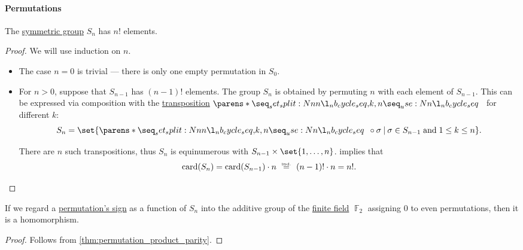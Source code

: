 \paragraph{Permutations}

\begin{proposition}\label{thm:symmetric_group_cardinality}
  The \hyperref[def:symmetric_group]{symmetric group} \( S_n \) has \( n! \) elements.
\end{proposition}
\begin{proof}
  We will use induction on \( n \).

  \begin{itemize}
    \item The case \( n = 0 \) is trivial --- there is only one empty permutation in \( S_0 \).

    \item For \( n > 0 \), suppose that \( S_{n - 1} \) has \( (n - 1)! \) elements. The group \( S_n \) is obtained by permuting \( n \) with each element of \( S_{n - 1} \). This can be expressed via composition with the \hyperref[def:transposition]{transposition} \( \cycle{ k, n } \) for different \( k \):
    \begin{equation*}
      S_n = \set{ \cycle{ k, n } \bincirc \sigma \given \sigma \in S_{n-1} \T{and} 1 \leq k \leq n }.
    \end{equation*}

    There are \( n \) such transpositions, thus \( S_n \) is equinumerous with \( S_{n-1} \times \set{ 1, \ldots, n } \).  implies that
    \begin{equation*}
      \card(S_n)
      =
      \card(S_{n-1}) \cdot n
      \reloset {\T{ind.}} =
      (n - 1)! \cdot n
      =
      n!.
    \end{equation*}
  \end{itemize}
\end{proof}

\begin{lemma}\label{thm:permutation_parity_homomorphism}
  If we regard a \hyperref[def:permutation_parity]{permutation's sign} as a function of \( S_n \) into the additive group of the \hyperref[def:finite_field]{finite field} \( \BbbF_2 \) assigning \( 0 \) to even permutations, then it is a homomorphism.
\end{lemma}
\begin{proof}
  Follows from \cref{thm:permutation_product_parity}.
\end{proof}

